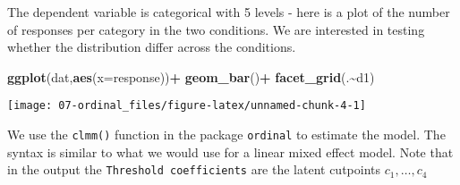 \documentclass[
]{book}
\newenvironment{Shaded}{\begin{snugshade}}{\end{snugshade}}
\newcommand{\AttributeTok}[1]{\textcolor[rgb]{0.13,0.29,0.53}{#1}}
\newcommand{\FunctionTok}[1]{\textcolor[rgb]{0.13,0.29,0.53}{\textbf{#1}}}
\newcommand{\NormalTok}[1]{#1}
\newcommand{\SpecialCharTok}[1]{\textcolor[rgb]{0.81,0.36,0.00}{\textbf{#1}}}
\begin{document}
The dependent variable is categorical with 5 levels - here is a plot of the number of responses per category in the two conditions. We are interested in testing whether the distribution differ across the conditions.

\begin{Shaded}
\begin{Highlighting}[]
\FunctionTok{ggplot}\NormalTok{(dat,}\FunctionTok{aes}\NormalTok{(}\AttributeTok{x=}\NormalTok{response))}\SpecialCharTok{+}
  \FunctionTok{geom\_bar}\NormalTok{()}\SpecialCharTok{+}
  \FunctionTok{facet\_grid}\NormalTok{(.}\SpecialCharTok{\textasciitilde{}}\NormalTok{d1)}
\end{Highlighting}
\end{Shaded}

\begin{center}\texttt{[image: 07-ordinal\_files/figure-latex/unnamed-chunk-4-1]} \end{center}

We use the \texttt{clmm()} function in the package \texttt{ordinal} to estimate the model. The syntax is similar to what we would use for a linear mixed effect model. Note that in the output the \texttt{Threshold\ coefficients} are the latent cutpoints \(c_1, \ldots, c_{4}\)
\end{document}

